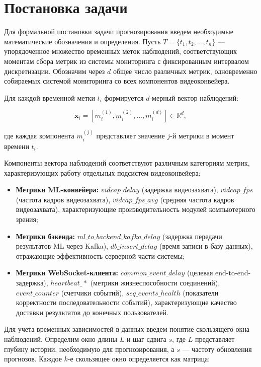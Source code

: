 \section{Постановка задачи}

\hspace*{1.25cm}Для формальной постановки задачи прогнозирования введем необходимые математические обозначения и определения. Пусть $T=\{t_1, t_2, \ldots, t_n\}$ --- упорядоченное множество временных меток наблюдений, соответствующих моментам сбора метрик из системы мониторинга с фиксированным интервалом дискретизации. Обозначим через $d$ общее число различных метрик, одновременно собираемых системой мониторинга со всех компонентов видеоконвейера.

\hspace*{1.25cm}Для каждой временной метки $t_i$ формируется $d$-мерный вектор наблюдений:

\begin{equation}
	\mathbf{x}_i = [m^{(1)}_i, m^{(2)}_i, \ldots, m^{(d)}_i] \in \mathbb{R}^d,
\end{equation}

где каждая компонента $m^{(j)}_i$ представляет значение $j$-й метрики в момент времени $t_i$.

\hspace*{1.25cm}Компоненты вектора наблюдений соответствуют различным категориям метрик, характеризующих работу отдельных подсистем видеоконвейера:

\begin{itemize}
	\item \textbf{Метрики ML-конвейера:} $vidcap\_delay$ (задержка видеозахвата), $vidcap\_fps$ (частота кадров видеозахвата), $vidcap\_fps\_avg$ (средняя частота кадров видеозахвата), характеризующие производительность модулей компьютерного зрения;
	\item \textbf{Метрики бэкенда:} $ml\_to\_backend\_kafka\_delay$ (задержка передачи результатов ML через Kafka), $db\_insert\_delay$ (время записи в базу данных), отражающие эффективность серверной части системы;
	\item \textbf{Метрики WebSocket-клиента:} $common\_event\_delay$ (целевая end-to-end-задержка), $heartbeat\_*$ (метрики жизнеспособности соединений), $event\_counter$ (счетчики событий), $seq\_events\_health$ (показатели корректности последовательности событий), характеризующие качество доставки результатов до конечных пользователей.
\end{itemize}

\hspace*{1.25cm}Для учета временных зависимостей в данных введем понятие скользящего окна наблюдений. Определим окно длины $L$ и шаг сдвига $s$, где $L$ представляет глубину истории, необходимую для прогнозирования, а $s$ --- частоту обновления прогнозов. Каждое $k$-е скользящее окно определяется как матрица:

